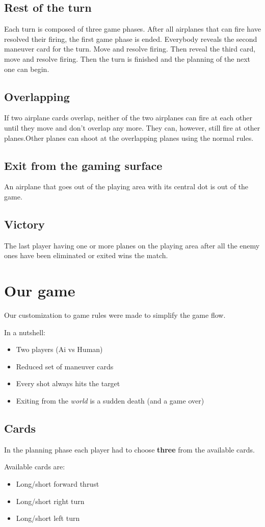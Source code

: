 \subsection{Rest of the turn}
Each turn is composed of three game phases. After all airplanes that can fire have resolved their firing, the first game phase is ended. Everybody reveals the second maneuver card for the  turn. Move and resolve firing. Then reveal the third card, move  and resolve firing. Then the turn is finished and the planning  of the next one can begin.
\subsection{Overlapping}
If two airplane cards overlap, neither of the two airplanes can fire at each other until they move and don’t overlap any more. They can, however, still fire at other planes.Other planes can shoot at the overlapping planes using the normal rules.
\subsection{Exit from the gaming surface}
An airplane that goes out of the playing area with its central dot is out of the game.
\subsection{Victory}
The last player having one or more planes on the playing area after all the enemy ones have been eliminated or exited wins the match.

\section{Our game}
\label{modify this name} 
Our customization to game rules were made to simplify the game flow.

In a nutshell:
\begin{itemize}
    \item Two players (Ai vs Human)
    \item Reduced set of maneuver cards 
    \item Every shot always hits the target
    \item Exiting from the \textit{world} is a sudden death (and a game over)           
\end{itemize}

\subsection{Cards}
In the planning phase each player had to choose \textbf{three} from the available cards.

Available cards are:
\begin{itemize}
    \item Long/short forward thrust
    \item Long/short right turn
    \item Long/short left turn
\end{itemize}